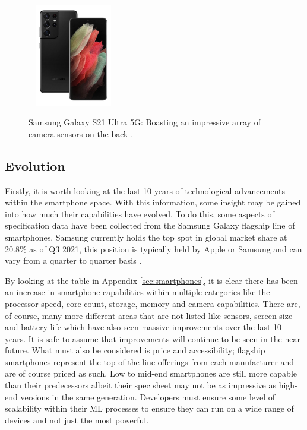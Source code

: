 \documentclass[12pt,a4paper]{report}
\begin{document}
\begin{figure}[h]\
    \centering
    \includegraphics[width=0.3\textwidth]{s21ultra.jpg}
    \caption{Samsung Galaxy S21 Ultra 5G: Boasting an impressive array of camera sensors on the back \citep{three2021}.}
\end{figure}

\break

\subsection{Evolution}

Firstly, it is worth looking at the last 10 years of technological advancements within the smartphone space. 
With this information, some insight may be gained into how much their capabilities have evolved. To do this, some
aspects of specification data have been collected from the Samsung Galaxy flagship line of smartphones. Samsung 
currently holds the top spot in global market share at 20.8\% as of Q3 2021, this position is typically held by Apple or
Samsung and can vary from a quarter to quarter basis \citep{odea2021}.

\par

By looking at the table in Appendix \ref{sec:smartphones}, it is clear there has been an increase in 
smartphone capabilities within 
multiple categories like the processor speed, core count, 
storage, memory and camera capabilities. There are, of course, many more different areas that are not listed like sensors, 
screen size and battery life which have also seen massive improvements over the last 10 years. It is safe to
assume that improvements will continue to be seen in the near future. 
What must also be considered is price and accessibility; flagship smartphones represent the top of the line offerings from
each manufacturer and are of course priced as such. Low to mid-end smartphones are still more capable 
than their predecessors albeit their spec sheet may not be as impressive as high-end versions in the same generation. 
Developers must ensure some level of scalability within their ML processes to ensure they can run on a wide range of
devices and not just the most powerful.
\end{document}
